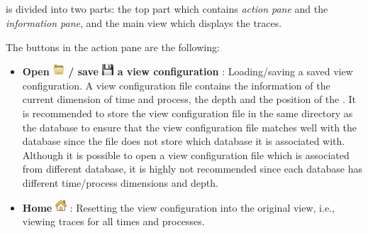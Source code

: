 
\subsection{\traceview}
\label{sec:traceview}

\traceview{} is divided into two parts: the top part which contains \emph{action pane} and the \emph{information pane}, and the main view which displays the traces. 

The buttons in the action pane are the following:
\begin{itemize}

\item \textbf{Open \includegraphics[scale=.7]{fig/hpctraceviewer-button-open.png} / save \includegraphics[scale=.5]{fig/hpctraceviewer-button-save.png} a view configuration} : Loading/saving a saved view configuration. 
A view configuration file contains the information of the current dimension of time and process, the depth and the position of the \crosshair{}. 
It is recommended to store the view configuration file in the same directory as the database to ensure that the view configuration file matches well with the database since the file does not store which database it is associated with. 
Although it is possible to open a view configuration file which is associated from different database, it is highly not recommended since each database has different time/process dimensions and depth.
\item \textbf{Home} \includegraphics[scale=.5]{fig/hpctraceviewer-button-home-screen.png} : Resetting the view configuration into the original view, i.e., viewing traces for all times and processes.


\end{itemize}
